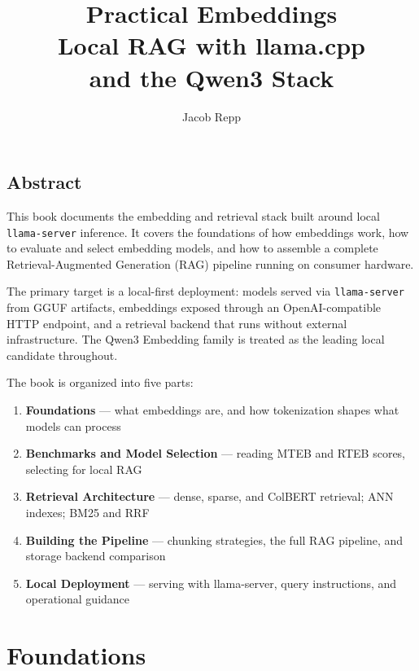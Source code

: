 \documentclass{professional-book}
\title{Practical Embeddings\\Local RAG with llama.cpp\\and the Qwen3 Stack}
\author{Jacob Repp}
\date{\bookdate}
\begin{document}
\maketitle

\frontmatter

\chapter*{Abstract}

This book documents the embedding and retrieval stack built around local \texttt{llama-server}
inference. It covers the foundations of how embeddings work, how to evaluate and select
embedding models, and how to assemble a complete Retrieval-Augmented Generation (RAG) pipeline
running on consumer hardware.

The primary target is a local-first deployment: models served via \texttt{llama-server} from
GGUF artifacts, embeddings exposed through an OpenAI-compatible HTTP endpoint, and a retrieval
backend that runs without external infrastructure. The Qwen3 Embedding family is treated as the
leading local candidate throughout.

The book is organized into five parts:

\begin{enumerate}
    \item \textbf{Foundations} --- what embeddings are, and how tokenization shapes what models can process
    \item \textbf{Benchmarks and Model Selection} --- reading MTEB and RTEB scores, selecting for local RAG
    \item \textbf{Retrieval Architecture} --- dense, sparse, and ColBERT retrieval; ANN indexes; BM25 and RRF
    \item \textbf{Building the Pipeline} --- chunking strategies, the full RAG pipeline, and storage backend comparison
    \item \textbf{Local Deployment} --- serving with llama-server, query instructions, and operational guidance
\end{enumerate}

\tableofcontents

\mainmatter

\part{Foundations}


\end{document}
